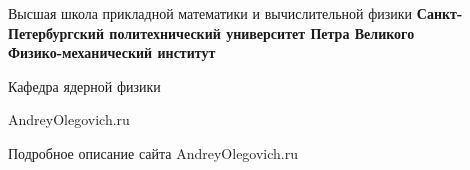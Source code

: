 \begin{titlepage}                                                         
    \newpage                                                                        
    \begin{center}    
    Высшая школа прикладной математики и вычислительной физики
    {\bfseries Санкт-Петербургский политехнический университет Петра Великого \\
    Физико-механический институт}                               
    \vspace{1cm}                                                                                             
                                                                                                        
    Кафедра ядерной физики                                                              
    \vspace{6em}                                                          
                                                                                        
                                                                                        
                                                                                        
                                                                                        
     AndreyOlegovich.ru \\                                                      
    \end{center}                                                          
                                                                                        
    \vspace{1.2em}                                                        
                                                                                        
    \begin{center}                                                        
    \Large Подробное описание сайта \linebreak                                  
    AndreyOlegovich.ru                                                                  
    \end{center}                                                          
                                                                                        

\end{titlepage}
